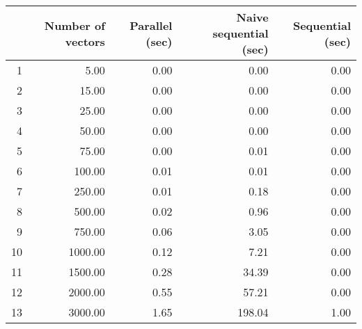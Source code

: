 \begin{table}[ht]
\centering
\begin{tabular}{rrrrr}
  \hline
 & Number of vectors & Parallel (sec) & Naive sequential (sec) & Sequential (sec) \\ 
  \hline
1 & 5.00 & 0.00 & 0.00 & 0.00 \\ 
  2 & 15.00 & 0.00 & 0.00 & 0.00 \\ 
  3 & 25.00 & 0.00 & 0.00 & 0.00 \\ 
  4 & 50.00 & 0.00 & 0.00 & 0.00 \\ 
  5 & 75.00 & 0.00 & 0.01 & 0.00 \\ 
  6 & 100.00 & 0.01 & 0.01 & 0.00 \\ 
  7 & 250.00 & 0.01 & 0.18 & 0.00 \\ 
  8 & 500.00 & 0.02 & 0.96 & 0.00 \\ 
  9 & 750.00 & 0.06 & 3.05 & 0.00 \\ 
  10 & 1000.00 & 0.12 & 7.21 & 0.00 \\ 
  11 & 1500.00 & 0.28 & 34.39 & 0.00 \\ 
  12 & 2000.00 & 0.55 & 57.21 & 0.00 \\ 
  13 & 3000.00 & 1.65 & 198.04 & 1.00 \\ 
   \hline
\end{tabular}
\end{table}
